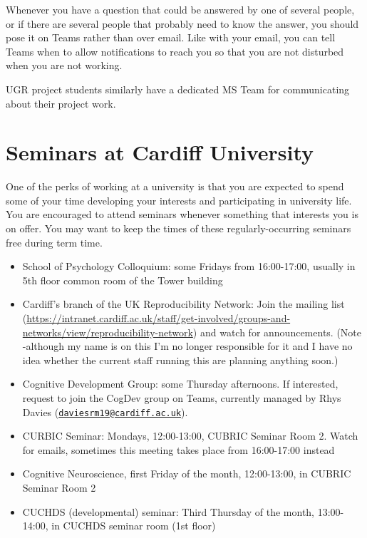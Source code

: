 \documentclass[
  12pt,
]{book}
\providecommand{\tightlist}{%
  \setlength{\itemsep}{0pt}\setlength{\parskip}{0pt}}
\begin{document}
Whenever you have a question that could be answered by one of several people, or if there are several people that probably need to know the answer, you should pose it on Teams rather than over email. Like with your email, you can tell Teams when to allow notifications to reach you so that you are not disturbed when you are not working.

UGR project students similarly have a dedicated MS Team for communicating about their project work.

\chapter{Seminars at Cardiff University}\label{seminars-at-cardiff-university}

One of the perks of working at a university is that you are expected to spend some of your time developing your interests and participating in university life. You are encouraged to attend seminars whenever something that interests you is on offer. You may want to keep the times of these regularly-occurring seminars free during term time.

\begin{itemize}
\tightlist
\item
  School of Psychology Colloquium: some Fridays from 16:00-17:00, usually in 5th floor common room of the Tower building
\item
  Cardiff's branch of the UK Reproducibility Network: Join the mailing list (\url{https://intranet.cardiff.ac.uk/staff/get-involved/groups-and-networks/view/reproducibility-network}) and watch for announcements. (Note -although my name is on this I'm no longer responsible for it and I have no idea whether the current staff running this are planning anything soon.)
\item
  Cognitive Development Group: some Thursday afternoons. If interested, request to join the CogDev group on Teams, currently managed by Rhys Davies (\href{mailto:daviesrm19@cardiff.ac.uk}{\nolinkurl{daviesrm19@cardiff.ac.uk}}).
\item
  CURBIC Seminar: Mondays, 12:00-13:00, CUBRIC Seminar Room 2. Watch for emails, sometimes this meeting takes place from 16:00-17:00 instead
\item
  Cognitive Neuroscience, first Friday of the month, 12:00-13:00, in CUBRIC Seminar Room 2
\item
  CUCHDS (developmental) seminar: Third Thursday of the month, 13:00-14:00, in CUCHDS seminar room (1st floor)
\end{itemize}
\end{document}
